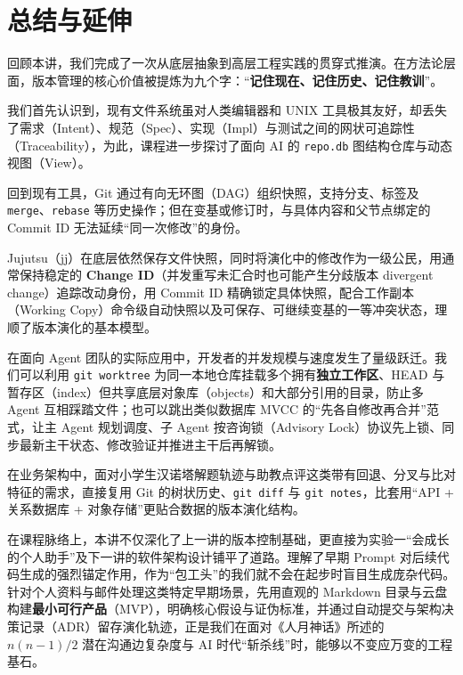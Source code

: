 \documentclass[UTF8,a4paper,11pt,fontset=fandol]{ctexart}
\begin{document}
\section{总结与延伸}

回顾本讲，我们完成了一次从底层抽象到高层工程实践的贯穿式推演。在方法论层面，版本管理的核心价值被提炼为九个字：“\textbf{记住现在、记住历史、记住教训}”。

我们首先认识到，现有文件系统虽对人类编辑器和 UNIX 工具极其友好，却丢失了需求（Intent）、规范（Spec）、实现（Impl）与测试之间的网状可追踪性（Traceability），为此，课程进一步探讨了面向 AI 的 \texttt{repo.db} 图结构仓库与动态视图（View）。

回到现有工具，Git 通过有向无环图（DAG）组织快照，支持分支、标签及 \texttt{merge}、\texttt{rebase} 等历史操作；但在变基或修订时，与具体内容和父节点绑定的 Commit ID 无法延续“同一次修改”的身份。

Jujutsu（jj）在底层依然保存文件快照，同时将演化中的修改作为一级公民，用通常保持稳定的 \textbf{Change ID}（并发重写未汇合时也可能产生分歧版本 divergent change）追踪改动身份，用 Commit ID 精确锁定具体快照，配合工作副本（Working Copy）命令级自动快照以及可保存、可继续变基的一等冲突状态，理顺了版本演化的基本模型。



在面向 Agent 团队的实际应用中，开发者的并发规模与速度发生了量级跃迁。我们可以利用 \texttt{git worktree} 为同一本地仓库挂载多个拥有\textbf{独立工作区}、HEAD 与暂存区（index）但共享底层对象库（objects）和大部分引用的目录，防止多 Agent 互相踩踏文件；也可以跳出类似数据库 MVCC 的“先各自修改再合并”范式，让主 Agent 规划调度、子 Agent 按咨询锁（Advisory Lock）协议先上锁、同步最新主干状态、修改验证并推进主干后再解锁。

在业务架构中，面对小学生汉诺塔解题轨迹与助教点评这类带有回退、分叉与比对特征的需求，直接复用 Git 的树状历史、\texttt{git diff} 与 \texttt{git notes}，比套用“API + 关系数据库 + 对象存储”更贴合数据的版本演化结构。



在课程脉络上，本讲不仅深化了上一讲的版本控制基础，更直接为实验一“会成长的个人助手”及下一讲的软件架构设计铺平了道路。理解了早期 Prompt 对后续代码生成的强烈锚定作用，作为“包工头”的我们就不会在起步时盲目生成庞杂代码。针对个人资料与邮件处理这类特定早期场景，先用直观的 Markdown 目录与云盘构建\textbf{最小可行产品}（MVP），明确核心假设与证伪标准，并通过自动提交与架构决策记录（ADR）留存演化轨迹，正是我们在面对《人月神话》所述的 \(n(n-1)/2\) 潜在沟通边复杂度与 AI 时代“斩杀线”时，能够以不变应万变的工程基石。
\end{document}
